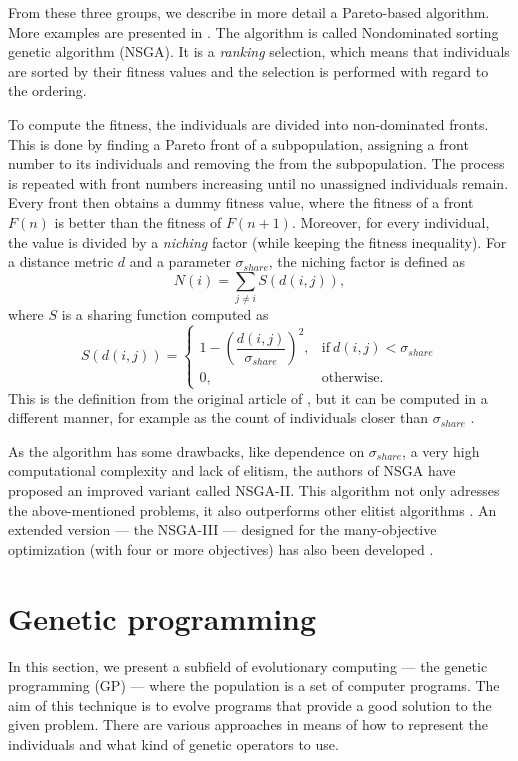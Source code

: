 From these three groups, we describe in more detail a Pareto-based algorithm.
More examples are presented in 
\cite[p.~170-173]{Engelbrecht:2007:CII:1557464}.
The algorithm is called Nondominated sorting genetic algorithm (NSGA). It is a
\emph{ranking} selection, which means that individuals are sorted by their
fitness values and the selection is performed with regard to the ordering.

To compute the fitness, the individuals are divided into non-dominated fronts.
This is done by finding a Pareto front of a subpopulation, assigning a
front number to its individuals and removing the from the subpopulation.
The process is repeated with front numbers increasing until no unassigned
individuals remain. Every front then obtains a dummy fitness value, where
the fitness of a front $F(n)$ is better than the fitness of $F(n+1)$. Moreover,
for every individual, the value is divided by a \emph{niching} factor (while
keeping the fitness inequality). For a distance metric $d$ and a parameter
$\sigma_{share}$, the niching factor is defined as
$$N(i)=\sum_{j\neq i}{S(d(i,j))},$$ where $S$ is a sharing function computed as
\begin{equation}
    S(d(i,j))=
    \begin{cases}
      1 - \left(\dfrac{d(i,j)}{\sigma_{share}}\right)^2, & \text{if}\ d(i,j) < \sigma_{share} \\
      0, & \text{otherwise.}
    \end{cases}
\end{equation}
This is the definition from the original article of
\cite{Srinivas:1994:MOU:1326668.1326671}, but it can be computed in a different
manner, for example as the count of individuals closer than $\sigma_{share}$
\citep{Engelbrecht:2007:CII:1557464}.

\label{nsgaii}
As the algorithm has some drawbacks, like dependence on $\sigma_{share}$,
a very high computational complexity and lack of elitism, the authors of NSGA have proposed an improved variant called NSGA-II. This algorithm not only
adresses the above-mentioned problems, it also outperforms other elitist
algorithms \citep{Deb:2002:FEM:2221359.2221582}. An extended version ---
the NSGA-III --- designed for the many-objective optimization (with four or more objectives)
has also been developed \citep{6600851}.

\section{Genetic programming} \label{sec:gp}
In this section, we present a subfield of evolutionary computing --- 
the genetic programming (GP) --- where the population is a set of computer 
programs. The aim of this technique is to evolve programs that provide 
a good solution to the given problem. There are various approaches in means 
of how to represent the individuals and what kind of genetic operators to 
use.

